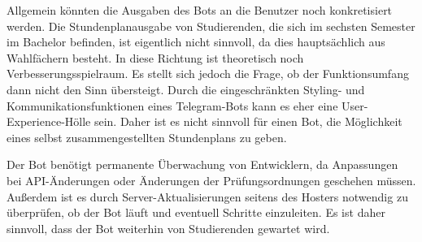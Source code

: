 Allgemein könnten die Ausgaben des Bots an die Benutzer noch konkretisiert werden. Die Stundenplanausgabe von Studierenden, die sich im sechsten Semester im Bachelor befinden, ist eigentlich nicht sinnvoll, da dies hauptsächlich aus Wahlfächern besteht. In diese Richtung ist theoretisch noch Verbesserungsspielraum.
Es stellt sich jedoch die Frage, ob der Funktionsumfang dann nicht den Sinn übersteigt. Durch die eingeschränkten Styling- und Kommunikationsfunktionen eines Telegram-Bots kann es eher eine User-Experience-Hölle sein. Daher ist es nicht sinnvoll für einen Bot, die Möglichkeit eines selbst zusammengestellten Stundenplans zu geben.

Der Bot benötigt permanente Überwachung von Entwicklern, da Anpassungen bei API-Änderungen oder Änderungen der Prüfungsordnungen geschehen müssen. Außerdem ist es durch Server-Aktualisierungen seitens des Hosters notwendig zu überprüfen, ob der Bot läuft und eventuell Schritte einzuleiten. Es ist daher sinnvoll, dass der Bot weiterhin von Studierenden gewartet wird.
